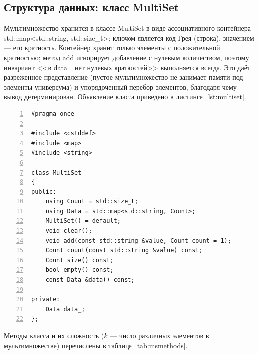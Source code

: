 \documentclass[14pt,a4paper]{extarticle}
\newcommand{\codefont}{\renewcommand{\baselinestretch}{1}\monofont\fontsize{10}{12}\selectfont}
\newcommand{\code}[1]{{\monofont #1}}
\begin{document}
\subsection{Структура данных: класс MultiSet}

Мультимножество хранится в классе \code{MultiSet} в виде ассоциативного контейнера \code{std::map<std::string, std::size\_t>}: ключом является код Грея (строка), значением --- его кратность. Контейнер хранит только элементы с положительной кратностью; метод \code{add} игнорирует добавление с нулевым количеством, поэтому инвариант <<в \code{data\_} нет нулевых кратностей>> выполняется всегда. Это даёт разреженное представление (пустое мультимножество не занимает памяти под элементы универсума) и упорядоченный перебор элементов, благодаря чему вывод детерминирован. Объявление класса приведено в листинге~\ref{lst:multiset}.

\label{lst:multiset}
\begin{Verbatim}[frame=single,framesep=3pt,numbers=left,numbersep=6pt,breaklines=true,tabsize=4,formatcom=\codefont,xleftmargin=18pt]
#pragma once

#include <cstddef>
#include <map>
#include <string>

class MultiSet
{
public:
    using Count = std::size_t;
    using Data = std::map<std::string, Count>;
    MultiSet() = default;
    void clear();
    void add(const std::string &value, Count count = 1);
    Count count(const std::string &value) const;
    Count size() const;
    bool empty() const;
    const Data &data() const;

private:
    Data data_;
};
\end{Verbatim}


Методы класса и их сложность ($k$ --- число различных элементов в мультимножестве) перечислены в таблице~\ref{tab:msmethods}.
\end{document}
